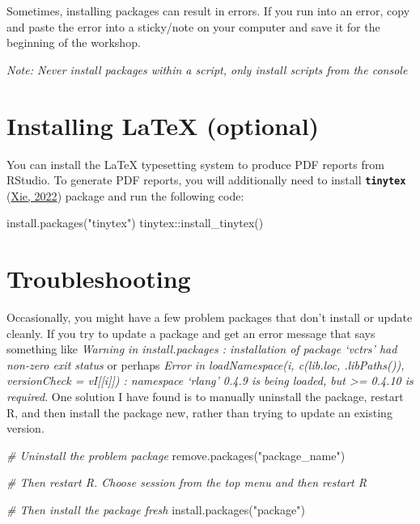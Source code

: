 \documentclass[
]{article}
\newenvironment{Shaded}{\begin{snugshade}}{\end{snugshade}}
\newcommand{\CommentTok}[1]{\textcolor[rgb]{0.56,0.35,0.01}{\textit{#1}}}
\newcommand{\FunctionTok}[1]{\textcolor[rgb]{0.00,0.00,0.00}{#1}}
\newcommand{\NormalTok}[1]{#1}
\newcommand{\SpecialCharTok}[1]{\textcolor[rgb]{0.00,0.00,0.00}{#1}}
\newcommand{\StringTok}[1]{\textcolor[rgb]{0.31,0.60,0.02}{#1}}
\begin{document}
Sometimes, installing packages can result in errors. If you run into an
error, copy and paste the error into a sticky/note on your computer and
save it for the beginning of the workshop.

\emph{Note: Never install packages within a script, only install scripts
from the console}

\hypertarget{installing-latex-optional}{%
\section{Installing LaTeX (optional)}\label{installing-latex-optional}}

You can install the LaTeX typesetting system to produce PDF reports from
RStudio. To generate PDF reports, you will additionally need to install
\textbf{\texttt{tinytex}}
(\href{https://psyteachr.github.io/reprores-v2/bookrefs.html\#ref-R-tinytex}{Xie,
2022}) package and run the following code:

\begin{Shaded}
\begin{Highlighting}[]
\FunctionTok{install.packages}\NormalTok{(}\StringTok{"tinytex"}\NormalTok{)}
\NormalTok{tinytex}\SpecialCharTok{::}\FunctionTok{install\_tinytex}\NormalTok{()}
\end{Highlighting}
\end{Shaded}

\hypertarget{troubleshooting}{%
\section{Troubleshooting}\label{troubleshooting}}

Occasionally, you might have a few problem packages that don't install
or update cleanly. If you try to update a package and get an error
message that says something like \emph{Warning in install.packages :
installation of package `vctrs' had non-zero exit status} or perhaps
\emph{Error in loadNamespace(i, c(lib.loc, .libPaths()), versionCheck =
vI{[}{[}i{]}{]}) : namespace `rlang' 0.4.9 is being loaded, but
\textgreater= 0.4.10 is required}. One solution I have found is to
manually uninstall the package, restart R, and then install the package
new, rather than trying to update an existing version.

\begin{Shaded}
\begin{Highlighting}[]
\CommentTok{\# Uninstall the problem package}
\FunctionTok{remove.packages}\NormalTok{(}\StringTok{"package\_name"}\NormalTok{)}

\CommentTok{\# Then restart R. Choose session from the top menu and then restart R}

\CommentTok{\# Then install the package fresh}
\FunctionTok{install.packages}\NormalTok{(}\StringTok{"package"}\NormalTok{)}
\end{Highlighting}
\end{Shaded}
\end{document}
